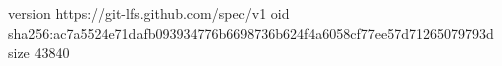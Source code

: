 version https://git-lfs.github.com/spec/v1
oid sha256:ac7a5524e71dafb093934776b6698736b624f4a6058cf77ee57d71265079793d
size 43840

